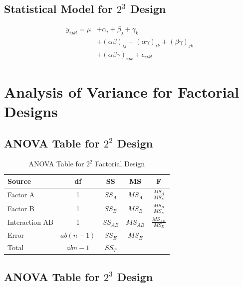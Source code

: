 \documentclass[twoside]{book}
\begin{document}
\subsection{Statistical Model for $2^3$ Design}

\begin{equation}
\begin{aligned}
y_{ijkl} = \mu &+ \alpha_i + \beta_j + \gamma_k \\
&+ (\alpha\beta)_{ij} + (\alpha\gamma)_{ik} + (\beta\gamma)_{jk} \\
&+ (\alpha\beta\gamma)_{ijk} + \epsilon_{ijkl}
\end{aligned}
\end{equation}

\section{Analysis of Variance for Factorial Designs}

\subsection{ANOVA Table for $2^2$ Design}

\begin{table}[h]
\centering
\caption{ANOVA Table for $2^2$ Factorial Design}
\begin{tabular}{|l|c|c|c|c|}
\hline
\textbf{Source} & \textbf{df} & \textbf{SS} & \textbf{MS} & \textbf{F} \\
\hline
Factor A & 1 & $SS_A$ & $MS_A$ & $\frac{MS_A}{MS_E}$ \\
Factor B & 1 & $SS_B$ & $MS_B$ & $\frac{MS_B}{MS_E}$ \\
Interaction AB & 1 & $SS_{AB}$ & $MS_{AB}$ & $\frac{MS_{AB}}{MS_E}$ \\
Error & $ab(n-1)$ & $SS_E$ & $MS_E$ & \\
\hline
Total & $abn-1$ & $SS_T$ & & \\
\hline
\end{tabular}
\end{table}

\subsection{ANOVA Table for $2^3$ Design}
\end{document}
